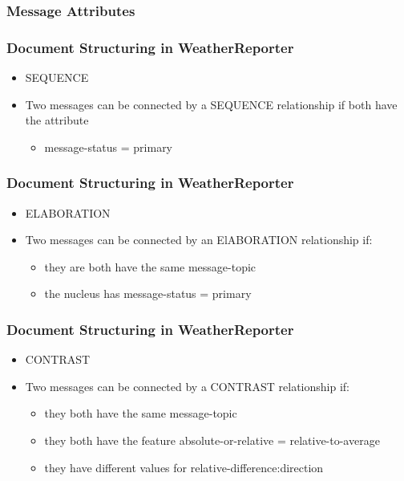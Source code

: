 \documentclass[compress,color=usenames]{beamer}
\begin{document}
\begin{frame}
\frametitle{Message Attributes}

\label{f162}
 
\end{frame}

\begin{frame}
\frametitle{Document Structuring in WeatherReporter}

\label{f164}
\begin{itemize}
\item { {SEQUENCE}}
\item { {Two messages can be connected by a SEQUENCE relationship if both have the attribute }}
\begin{itemize}
\item message-status = primary
\end{itemize}
\end{itemize}
 
\end{frame}

\begin{frame}
\frametitle{Document Structuring in WeatherReporter}

\label{f166}
\begin{itemize}
\item { {ELABORATION}}
\item { {Two messages can be connected by an ElABORATION relationship if:}}
\begin{itemize}
\item they are both have the same message-topic
\item the nucleus has message-status = primary
\end{itemize}
\end{itemize}
 
\end{frame}

\begin{frame}
\frametitle{Document Structuring in WeatherReporter}

\label{f168}
\begin{itemize}
\item { {CONTRAST}}
\item { {Two messages can be connected by a CONTRAST relationship if:}}
\begin{itemize}
\item they both have the same message-topic
\item they both have the feature
absolute-or-relative = relative-to-average
\item they have different values for
relative-difference:direction
\end{itemize}
\end{itemize}
 
\end{frame}
\end{document}
